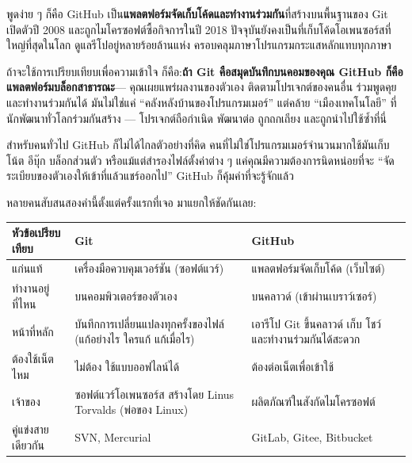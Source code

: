 


พูดง่าย ๆ ก็คือ GitHub เป็น\textbf{แพลตฟอร์มจัดเก็บโค้ดและทำงานร่วมกัน}ที่สร้างบนพื้นฐานของ Git เปิดตัวปี 2008 และถูกไมโครซอฟต์ซื้อกิจการในปี 2018 ปัจจุบันยังคงเป็นที่เก็บโค้ดโอเพนซอร์สที่ใหญ่ที่สุดในโลก ดูแลรีโปอยู่หลายร้อยล้านแห่ง ครอบคลุมภาษาโปรแกรมกระแสหลักแทบทุกภาษา

ถ้าจะใช้การเปรียบเทียบเพื่อความเข้าใจ ก็คือ:\textbf{ถ้า Git คือสมุดบันทึกบนคอมของคุณ GitHub ก็คือแพลตฟอร์มบล็อกสาธารณะ}— คุณเผยแพร่ผลงานของตัวเอง ติดตามโปรเจกต์ของคนอื่น ร่วมพูดคุยและทำงานร่วมกันได้ มันไม่ใช่แค่ “คลังหลังบ้านของโปรแกรมเมอร์” แต่คล้าย “เมืองเทคโนโลยี” ที่นักพัฒนาทั่วโลกร่วมกันสร้าง — โปรเจกต์ถือกำเนิด พัฒนาต่อ ถูกถกเถียง และถูกนำไปใช้ซ้ำที่นี่

สำหรับคนทั่วไป GitHub ก็ไม่ได้ไกลตัวอย่างที่คิด คนที่ไม่ใช่โปรแกรมเมอร์จำนวนมากใช้มันเก็บโน้ต อีบุ๊ก บล็อกส่วนตัว หรือแม้แต่สำรองไฟล์ตั้งค่าต่าง ๆ แค่คุณมีความต้องการนิดหน่อยที่จะ “จัดระเบียบของตัวเองให้เข้าที่แล้วแชร์ออกไป” GitHub ก็คุ้มค่าที่จะรู้จักแล้ว


หลายคนสับสนสองคำนี้ตั้งแต่ครั้งแรกที่เจอ มาแยกให้ชัดกันเลย:

\begin{center}
\begin{tabularx}{\linewidth}{|X|X|X|}
\hline
\textbf{หัวข้อเปรียบเทียบ} & \textbf{Git} & \textbf{GitHub} \tabularnewline
\hline
แก่นแท้ & เครื่องมือควบคุมเวอร์ชัน (ซอฟต์แวร์) & แพลตฟอร์มจัดเก็บโค้ด (เว็บไซต์) \tabularnewline
ทำงานอยู่ที่ไหน & บนคอมพิวเตอร์ของตัวเอง & บนคลาวด์ (เข้าผ่านเบราว์เซอร์) \tabularnewline
หน้าที่หลัก & บันทึกการเปลี่ยนแปลงทุกครั้งของไฟล์ (แก้อย่างไร ใครแก้ แก้เมื่อไร) & เอารีโป Git ขึ้นคลาวด์ เก็บ โชว์ และทำงานร่วมกันได้สะดวก \tabularnewline
ต้องใช้เน็ตไหม & ไม่ต้อง ใช้แบบออฟไลน์ได้ & ต้องต่อเน็ตเพื่อเข้าใช้ \tabularnewline
เจ้าของ & ซอฟต์แวร์โอเพนซอร์ส สร้างโดย Linus Torvalds (พ่อของ Linux) & ผลิตภัณฑ์ในสังกัดไมโครซอฟต์ \tabularnewline
คู่แข่งสายเดียวกัน & SVN, Mercurial & GitLab, Gitee, Bitbucket \tabularnewline
\hline
\end{tabularx}
\end{center}

